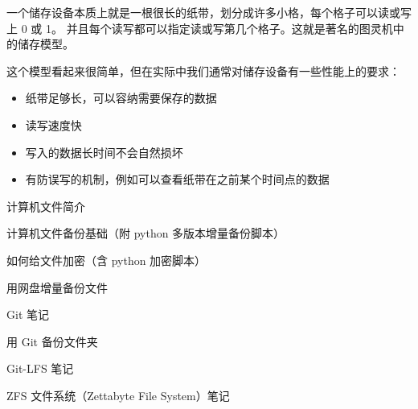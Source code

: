 
\begin{issues}
\issueDraft
\end{issues}

一个储存设备本质上就是一根很长的纸带，划分成许多小格，每个格子可以读或写上 0 或 1。 并且每个读写都可以指定读或写第几个格子。这就是著名的图灵机中的储存模型。

这个模型看起来很简单，但在实际中我们通常对储存设备有一些性能上的要求：
\begin{itemize}
\item 纸带足够长，可以容纳需要保存的数据
\item 读写速度快
\item 写入的数据长时间不会自然损坏
\item 有防误写的机制，例如可以查看纸带在之前某个时间点的数据
\end{itemize}


计算机文件简介

计算机文件备份基础（附 python 多版本增量备份脚本）

如何给文件加密（含 python 加密脚本）

用网盘增量备份文件

Git 笔记

用 Git 备份文件夹

Git-LFS 笔记

ZFS 文件系统（Zettabyte File System）笔记
